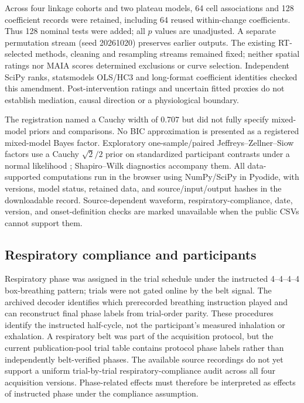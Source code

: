 Across four linkage cohorts and two plateau models, 64 cell associations and 128 coefficient records were retained, including 64 reused within-change coefficients. Thus 128 nominal tests were added; all $p$ values are unadjusted. A separate permutation stream (seed 20261020) preserves earlier outputs. The existing RT-selected methods, cleaning and resampling streams remained fixed; neither spatial ratings nor MAIA scores determined exclusions or curve selection. Independent SciPy ranks, statsmodels OLS/HC3 and long-format coefficient identities checked this amendment. Post-intervention ratings and uncertain fitted proxies do not establish mediation, causal direction or a physiological boundary.

The registration named a Cauchy width of 0.707 but did not fully specify mixed-model priors and comparisons. No BIC approximation is presented as a registered mixed-model Bayes factor. Exploratory one-sample/paired Jeffreys--Zellner--Siow factors use a Cauchy $\sqrt{2}/2$ prior on standardized participant contrasts under a normal likelihood \citep{Rouder2009BayesianT}; Shapiro--Wilk diagnostics accompany them. All data-supported computations run in the browser using NumPy/SciPy in Pyodide, with versions, model status, retained data, and source/input/output hashes in the downloadable record. Source-dependent waveform, respiratory-compliance, date, version, and onset-definition checks are marked unavailable when the public CSVs cannot support them.

\subsection{Respiratory compliance and participants}

Respiratory phase was assigned in the trial schedule under the instructed 4--4--4--4 box-breathing pattern; trials were not gated online by the belt signal. The archived decoder identifies which prerecorded breathing instruction played and can reconstruct final phase labels from trial-order parity. These procedures identify the instructed half-cycle, not the participant's measured inhalation or exhalation. A respiratory belt was part of the acquisition protocol, but the current publication-pool trial table contains protocol phase labels rather than independently belt-verified phases. The available source recordings do not yet support a uniform trial-by-trial respiratory-compliance audit across all four acquisition versions. Phase-related effects must therefore be interpreted as effects of instructed phase under the compliance assumption.

